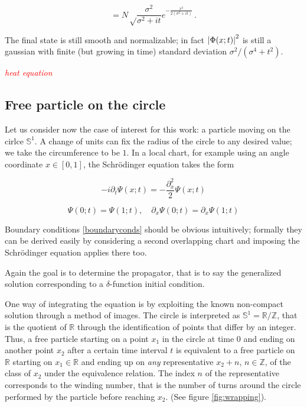\documentclass{article}
\newcommand{\ess}{\ensuremath{\mathbb{S}}}
\newcommand{\ar}{\ensuremath{\mathbb{R}}}
\newcommand{\cmnt}[1]{\textcolor{red}{\emph{#1}}}
\begin{document}
\begin{equation}
    = N \sqrt\frac{\sigma^2}{\sigma^2 + it} e^{-\frac{x^2}{2(\sigma^2 + it)}}\,.
\end{equation}

The final state is still smooth and normalizable; in fact $\abs{\Phi(x;t)}^2$ is still a gaussian with finite (but growing in time) standard deviation $\sigma^2/(\sigma^4 + t^2)$.


\cmnt{heat equation}

\subsection{Free particle on the circle}

Let us consider now the case of interest for this work: a particle moving on the cirlce $\ess^1$. A change of units can fix the radius of the circle to any desired value; we take the circumference to be $1$. In a local chart, for example using an angle coordinate $x \in [0,1]$, the Schr\"odinger equation takes the form

\begin{equation}
    -i\partial_t \Psi(x;t) = - \frac{\partial_x^2}{2} \Psi(x;t)
\end{equation}

\begin{equation}    
    \label{boundaryconds}
    \Psi(0;t) = \Psi(1;t), \quad \partial_x \Psi(0;t) = \partial_x \Psi(1;t)
\end{equation}

Boundary conditions \eqref{boundaryconds} should be obvious intuitively; formally they can be derived easily by considering a second overlapping chart and imposing the Schr\"odinger equation applies there too.

Again the goal is to determine the propagator, that is to say the generalized solution corresponding to a $\delta$-function initial condition.

One way of integrating the equation is by exploiting the known non-compact solution through a method of images. The circle is interpreted as $\ess^1 = \ar / \mathbb{Z}$, that is the quotient of $\ar$ through the identification of points that differ by an integer. Thus, a free particle starting on a point $x_1$ in the circle at time $0$ and ending on another point $x_2$ after a certain time interval $t$ is equivalent to a free particle on $\mathbb{R}$ starting on $x_1 \in \mathbb{R}$ and ending up on \emph{any} representative $x_2 + n$, $n\in\mathbb{Z}$, of the class of $x_2$ under the equivalence relation. The index $n$ of the representative corresponds to the winding number, that is the number of turns around the circle performed by the particle before reaching $x_2$. (See figure \ref{fig:wrapping}).
\end{document}
